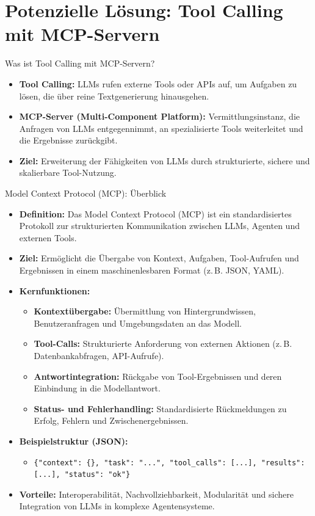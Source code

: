 \documentclass[aspectratio=1610, xcolor=dvipsnames, 9pt]{beamer}
\begin{document}
\section{Potenzielle Lösung: Tool Calling mit MCP-Servern}

\begin{frame}{Was ist Tool Calling mit MCP-Servern?}
  \begin{itemize}
    \item \textbf{Tool Calling:} LLMs rufen externe Tools oder APIs auf, um Aufgaben zu lösen, die über reine Textgenerierung hinausgehen.
    \item \textbf{MCP-Server (Multi-Component Platform):} Vermittlungsinstanz, die Anfragen von LLMs entgegennimmt, an spezialisierte Tools weiterleitet und die Ergebnisse zurückgibt.
    \item \textbf{Ziel:} Erweiterung der Fähigkeiten von LLMs durch strukturierte, sichere und skalierbare Tool-Nutzung.
  \end{itemize}
\end{frame}

\begin{frame}{Model Context Protocol (MCP): Überblick}
  \begin{itemize}
    \item \textbf{Definition:} Das Model Context Protocol (MCP) ist ein standardisiertes Protokoll zur strukturierten Kommunikation zwischen LLMs, Agenten und externen Tools.
    \item \textbf{Ziel:} Ermöglicht die Übergabe von Kontext, Aufgaben, Tool-Aufrufen und Ergebnissen in einem maschinenlesbaren Format (z.\,B. JSON, YAML).
    \item \textbf{Kernfunktionen:}
      \begin{itemize}
        \item \textbf{Kontextübergabe:} Übermittlung von Hintergrundwissen, Benutzeranfragen und Umgebungsdaten an das Modell.
        \item \textbf{Tool-Calls:} Strukturierte Anforderung von externen Aktionen (z.\,B. Datenbankabfragen, API-Aufrufe).
        \item \textbf{Antwortintegration:} Rückgabe von Tool-Ergebnissen und deren Einbindung in die Modellantwort.
        \item \textbf{Status- und Fehlerhandling:} Standardisierte Rückmeldungen zu Erfolg, Fehlern und Zwischenergebnissen.
      \end{itemize}
    \item \textbf{Beispielstruktur (JSON):}
      \begin{itemize}
        \item \texttt{\{"context": \{\}, "task": "...", "tool\_calls": [...], "results": [...], "status": "ok"\}}
      \end{itemize}
    \item \textbf{Vorteile:} Interoperabilität, Nachvollziehbarkeit, Modularität und sichere Integration von LLMs in komplexe Agentensysteme.
  \end{itemize}
\end{frame}
\end{document}
